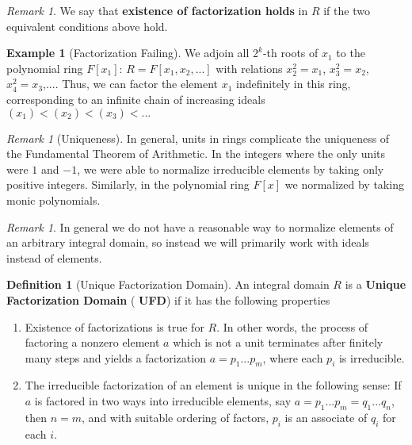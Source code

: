 \documentclass[12pt]{article}
\theoremstyle{definition}
\newtheorem{defn}[thm]{Definition}
\newtheorem{eg}[thm]{Example}
\theoremstyle{remark}
\newtheorem{rmk}[thm]{Remark}
\numberwithin{equation}{section}
\newcommand\B[1]{\textbf{ #1}}
\begin{document}
\begin{rmk}
        We say that \B{existence of factorization holds} in $R$ if the two equivalent conditions above hold.
\end{rmk}


\vspace{15pt}

\begin{eg}[Factorization Failing]
        We adjoin all $2^k$-th roots of $x_1$ to the polynomial ring $F[x_1]$: $R = F[x_1,x_2,...]$ with relations $x_2^2 = x_1$, $x_3^2 = x_2$, $x_4^2 = x_3$,.... Thus, we can factor the element $x_1$ indefinitely in this ring, corresponding to an infinite chain of increasing ideals $(x_1) < (x_2) < (x_3) < ...$
\end{eg}

\vspace{15pt}

\begin{rmk}[Uniqueness]
        In general, units in rings complicate the uniqueness of the Fundamental Theorem of Arithmetic. In the integers where the only units were $1$ and $-1$, we were able to normalize irreducible elements by taking only positive integers. Similarly, in the polynomial ring $F[x]$ we normalized by taking monic polynomials.
\end{rmk}

\vspace{15pt}

\begin{rmk}
        In general we do not have a reasonable way to normalize elements of an arbitrary integral domain, so instead we will primarily work with ideals instead of elements.
\end{rmk}

\vspace{15pt}

\begin{defn}[Unique Factorization Domain]
        An integral domain $R$ is a \B{Unique Factorization Domain} (\B{UFD}) if it has the following properties \begin{enumerate}
                \item Existence of factorizations is true for $R$. In other words, the process of factoring a nonzero element $a$ which is not a unit terminates after finitely many steps and yields a factorization $a = p_1...p_m$, where each $p_i$ is irreducible.
                \item The irreducible factorization of an element is unique in the following sense: If $a$ is factored in two ways into irreducible elements, say $a = p_1...p_m = q_1...q_n$, then $n = m$, and with suitable ordering of factors, $p_i$ is an associate of $q_i$ for each $i$.
        \end{enumerate}
\end{defn}
\end{document}
